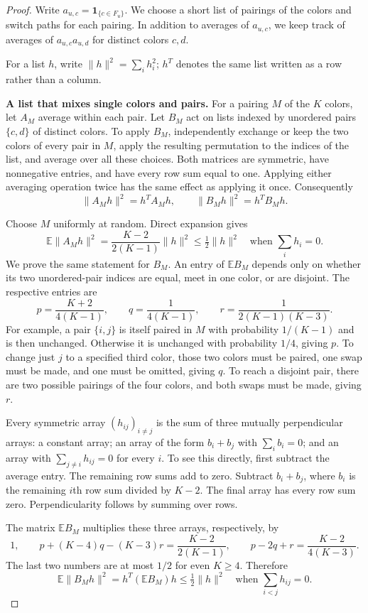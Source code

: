 \documentclass[11pt]{article}
\theoremstyle{definition}\newtheorem{algorithm}{Algorithm}[section]
\numberwithin{equation}{section}
\theoremstyle{remark}\newtheorem*{remark}{Remark}
\newcommand{\E}{\mathbb E}
\newcommand{\one}{\mathbf 1}
\begin{document}
\begin{proof}
Write $a_{u,c}=\one_{\{c\in F_u\}}$. We choose a short list of pairings
of the colors and switch paths for each pairing. In addition
to averages of $a_{u,c}$, we keep track of averages of $a_{u,c}a_{u,d}$
for distinct colors $c,d$.

For a list $h$, write $\|h\|^2=\sum_i h_i^2$; $h^T$ denotes the
same list written as a row rather than a column.

\medskip\noindent\textbf{A list that mixes single colors and pairs.}
For a pairing $M$ of the $K$ colors, let $A_M$ average within each pair.
Let $B_M$ act on lists indexed by unordered pairs $\{c,d\}$ of distinct
colors. To apply $B_M$, independently exchange or keep the two colors
of every pair in $M$, apply the resulting permutation to the indices of
the list, and average over all these choices. Both matrices are symmetric,
have nonnegative entries, and have every row sum equal to one. Applying
either averaging operation twice has the same effect as applying it once.
Consequently
\[
 \|A_Mh\|^2=h^TA_Mh,\qquad
 \|B_Mh\|^2=h^TB_Mh.
\]

Choose $M$ uniformly at random. Direct expansion gives
\[
 \E\|A_Mh\|^2=\frac{K-2}{2(K-1)}\|h\|^2
 \le\tfrac12\|h\|^2
 \quad\text{when }\sum_i h_i=0.
\]
We prove the same statement for $B_M$. An entry of $\E B_M$ depends only
on whether its two unordered-pair indices are equal, meet in one color,
or are disjoint. The respective entries are
\[
 p=\frac{K+2}{4(K-1)},\qquad
 q=\frac1{4(K-1)},\qquad
 r=\frac1{2(K-1)(K-3)}.
\]
For example, a pair $\{i,j\}$ is itself paired in $M$ with probability
$1/(K-1)$ and is then unchanged. Otherwise it is unchanged with
probability $1/4$, giving $p$. To change just $j$ to a specified third
color, those two colors must be paired, one swap must be made, and one
must be omitted, giving $q$. To reach a disjoint pair, there are two
possible pairings of the four colors, and both swaps must be made,
giving $r$.

Every symmetric array $(h_{ij})_{i\ne j}$ is the sum of three mutually
perpendicular arrays: a constant array; an array of the form $b_i+b_j$
with $\sum_i b_i=0$; and an array with
$\sum_{j\ne i}h_{ij}=0$ for every $i$. To see this directly, first
subtract the average entry. The remaining row sums add to zero.
Subtract $b_i+b_j$, where $b_i$ is the remaining $i$th row sum divided
by $K-2$. The final array has every row sum zero. Perpendicularity follows
by summing over rows.

The matrix $\E B_M$ multiplies these three arrays, respectively, by
\[
 1,\qquad
 p+(K-4)q-(K-3)r=\frac{K-2}{2(K-1)},\qquad
 p-2q+r=\frac{K-2}{4(K-3)}.
\]
The last two numbers are at most $1/2$ for even $K\ge4$. Therefore
\[
 \E\|B_Mh\|^2=h^T(\E B_M)h\le\tfrac12\|h\|^2
 \quad\text{when }\sum_{i<j}h_{ij}=0.
\]


\end{proof}
\end{document}

